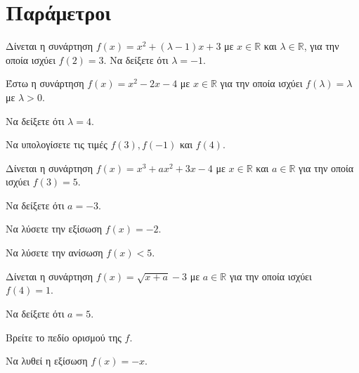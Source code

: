 \documentclass[11pt,a4paper,twocolumn]{article}
\begin{document}
\section{Παράμετροι}
\begin{askhseis}
\item Δίνεται η συνάρτηση $f(x)=x^2+(\lambda-1)x+3$ με $x\in\mathbb{R}$ και $\lambda\in\mathbb{R}$, για την οποία ισχύει $f(2)=3$. Να δείξετε ότι $\lambda=-1$.
\item Έστω η συνάρτηση $f(x)=x^2-2x-4$ με $x\in\mathbb{R}$ για την οποία ισχύει $f(\lambda)=\lambda$ με $\lambda>0$.
\begin{alist}
\item Να δείξετε ότι $\lambda=4$.
\item Να υπολογίσετε τις τιμές $f(3),f(-1)$ και $f(4)$.
\end{alist}
\item Δίνεται η συνάρτηση $f(x)=x^3+ax^2+3x-4$ με $x\in\mathbb{R}$ και $a\in\mathbb{R}$ για την οποία ισχύει $f(3)=5$.
\begin{alist}
\item Να δείξετε ότι $a=-3$.
\item Να λύσετε την εξίσωση $f(x)=-2$.
\item Να λύσετε την ανίσωση $f(x)<5$.
\end{alist}
\item Δίνεται η συνάρτηση $f(x)=\sqrt{x+a}-3$ με $a\in\mathbb{R}$ για την οποία ισχύει $f(4)=1$.
\begin{alist}
\item Να δείξετε ότι $a=5$.
\item Βρείτε το πεδίο ορισμού της $f$.
\item Να λυθεί η εξίσωση $f(x)=-x$.
\end{alist}
\end{askhseis}
\end{document}
